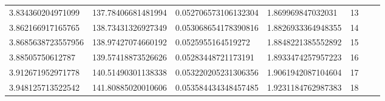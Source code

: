 \documentclass[11pt,twoside,a4paper]{article}
\begin{document}
\begin{table}[htb]
\begin{tabular}{lllllll}
3.834360204971099                         & 137.78406681481994                       & 0.052706573106132304                        & 1.869969847032031                         & 13      &  \\
3.862166917165765                         & 138.73431326927349                       & 0.053068654178390816                        & 1.8826933364948355                        & 14      &  \\
3.8685638723557956                        & 138.97427074660192                       & 0.0525955164519272                          & 1.8848221385552892                        & 15      &  \\
3.88505750612787                          & 139.57418873526626                       & 0.05283448721173191                         & 1.8933474257957223                        & 16      &  \\
3.912671952971778                         & 140.51490301138338                       & 0.053220205231306356                        & 1.9061942087104604                        & 17      &  \\
3.948125713522542                         & 141.80885020010606                       & 0.053584434348457485                        & 1.9231184762987383                        & 18      & 
\end{tabular}
\end{table}


\vspace{2cm}
\end{document}
